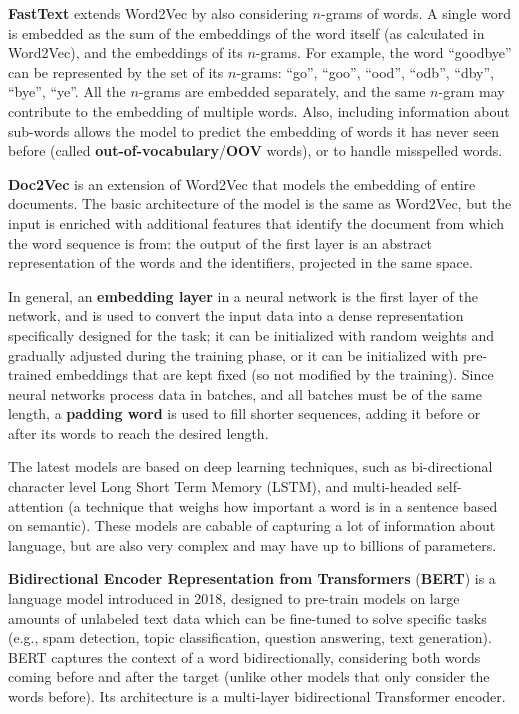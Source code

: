 \textbf{FastText} extends Word2Vec by also considering $n$-grams of words. A single word is embedded as the sum of the embeddings of the word itself (as calculated in Word2Vec), and the embeddings of its $n$-grams. For example, the word ``goodbye'' can be represented by the set of its $n$-grams: ``go'', ``goo'', ``ood'', ``odb'', ``dby'', ``bye'', ``ye''. All the $n$-grams are embedded separately, and the same $n$-gram may contribute to the embedding of multiple words. Also, including information about sub-words allows the model to predict the embedding of words it has never seen before (called \textbf{out-of-vocabulary}/\textbf{OOV} words), or to handle misspelled words.

\textbf{Doc2Vec} is an extension of Word2Vec that models the embedding of entire documents. The basic architecture of the model is the same as Word2Vec, but the input is enriched with additional features that identify the document from which the word sequence is from: the output of the first layer is an abstract representation of the words and the identifiers, projected in the same space.

In general, an \textbf{embedding layer} in a neural network is the first layer of the network, and is used to convert the input data into a dense representation specifically designed for the task; it can be initialized with random weights and gradually adjusted during the training phase, or it can be initialized with pre-trained embeddings that are kept fixed (so not modified by the training). Since neural networks process data in batches, and all batches must be of the same length, a \textbf{padding word} is used to fill shorter sequences, adding it before or after its words to reach the desired length.

The latest models are based on deep learning techniques, such as bi-directional character level Long Short Term Memory (LSTM), and multi-headed self-attention (a technique that weighs how important a word is in a sentence based on semantic). These models are cabable of capturing a lot of information about language, but are also very complex and may have up to billions of parameters.

\textbf{Bidirectional Encoder Representation from Transformers} (\textbf{BERT}) is a language model introduced in 2018, designed to pre-train models on large amounts of unlabeled text data which can be fine-tuned to solve specific tasks (e.g., spam detection, topic classification, question answering, text generation). BERT captures the context of a word bidirectionally, considering both words coming before and after the target (unlike other models that only consider the words before). Its architecture is a multi-layer bidirectional Transformer encoder.

